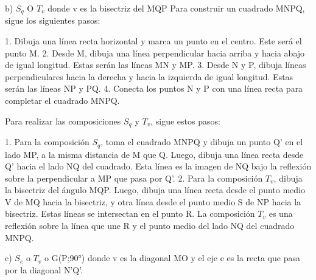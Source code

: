 \documentclass{article}
\begin{document}
b) $S_q$ O $T_v$ donde v es la bisectriz del MQP
Para construir un cuadrado MNPQ, sigue los siguientes pasos:

1. Dibuja una línea recta horizontal y marca un punto en el centro. Este será el punto M.
2. Desde M, dibuja una línea perpendicular hacia arriba y hacia abajo de igual longitud. Estas serán las líneas MN y MP.
3. Desde N y P, dibuja líneas perpendiculares hacia la derecha y hacia la izquierda de igual longitud. Estas serán las líneas NP y PQ.
4. Conecta los puntos N y P con una línea recta para completar el cuadrado MNPQ.

Para realizar las composiciones $S_q$ y $T_v$, sigue estos pasos:

1. Para la composición $S_q$, toma el cuadrado MNPQ y dibuja un punto Q' en el lado MP, a la misma distancia de M que Q. Luego, dibuja una línea recta desde Q' hacia el lado NQ del cuadrado. Esta línea es la imagen de NQ bajo la reflexión sobre la perpendicular a MP que pasa por Q'.
2. Para la composición $T_v$, dibuja la bisectriz del ángulo MQP. Luego, dibuja una línea recta desde el punto medio V de MQ hacia la bisectriz, y otra línea desde el punto medio S de NP hacia la bisectriz. Estas líneas se intersectan en el punto R. La composición $T_v$ es una reflexión sobre la línea que une R y el punto medio del lado NQ del cuadrado MNPQ.


c) $S_e$ o $T_v$ o G(P;90°) donde v es la diagonal MO y el eje e es la recta que pasa por la diagonal N’Q’.
\end{document}
